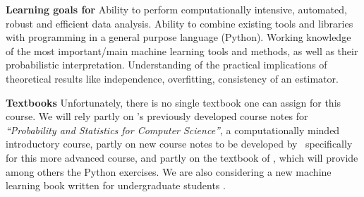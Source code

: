 \item[]{\bf Learning goals for \statcl} Ability to perform computationally intensive, automated, robust and efficient data analysis. Ability to combine existing tools and libraries with programming in a general purpose language (Python). 
Working knowledge of the most important/main machine learning tools and methods, as well as their probabilistic interpretation. Understanding of the practical implications of theoretical results like independence, overfitting, consistency of an estimator. 

{\bf Textbooks} Unfortunately, there is no single textbook one can
assign for this course. We will rely partly on \meila's previously
developed course notes for {\it ``Probability and Statistics for
  Computer Science''}, a computationally minded introductory course,
partly on new course notes to be developed by \meila\ specifically for
this more advanced course, and partly on the textbook of \astrocl, 
which will provide among others the Python exercises. We are also
considering a new machine learning book written for undergraduate
students \cite{}. 

